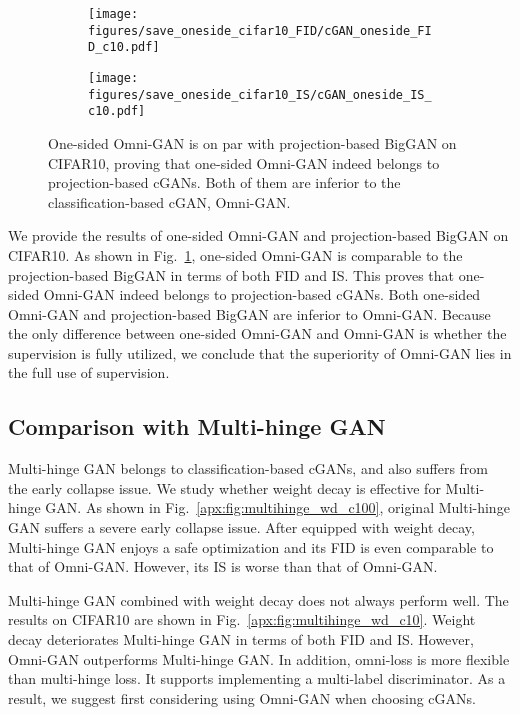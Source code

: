 \documentclass[paper_2425.tex]{subfiles}
\begin{document}
\begin{figure}[!t]
  \begin{subfigure}{0.49\linewidth}
    \centering
\texttt{[image: figures/save\_oneside\_cifar10\_FID/cGAN\_oneside\_FID\_c10.pdf]}
\caption{}
\end{subfigure}
  \begin{subfigure}{0.49\linewidth}
    \centering
\texttt{[image: figures/save\_oneside\_cifar10\_IS/cGAN\_oneside\_IS\_c10.pdf]}
\caption{}
\end{subfigure}
  \caption{One-sided Omni-GAN is on par with projection-based BigGAN on CIFAR10, proving that one-sided Omni-GAN indeed belongs to projection-based cGANs. Both of them are inferior to the classification-based cGAN, Omni-GAN.}
  \label{apx:fig:oneside_c10}
\end{figure}

We provide the results of one-sided Omni-GAN and projection-based BigGAN on CIFAR10. As shown in Fig.~\ref{apx:fig:oneside_c10}, one-sided Omni-GAN is comparable to the projection-based BigGAN in terms of both FID and IS. This proves that one-sided Omni-GAN indeed belongs to projection-based cGANs. Both one-sided Omni-GAN and projection-based BigGAN are inferior to Omni-GAN. Because the only difference between one-sided Omni-GAN and Omni-GAN is whether the supervision is fully utilized, we conclude that the superiority of Omni-GAN lies in the full use of supervision.


\subsection{Comparison with Multi-hinge GAN}
\label{sec:comparison_multihinge}

Multi-hinge GAN belongs to classification-based cGANs, and also suffers from the early collapse issue. We study whether weight decay is effective for Multi-hinge GAN. As shown in Fig.~\ref{apx:fig:multihinge_wd_c100}, original Multi-hinge GAN suffers a severe early collapse issue. After equipped with weight decay, Multi-hinge GAN enjoys a safe optimization and its FID is even comparable to that of Omni-GAN. However, its IS is worse than that of Omni-GAN.

Multi-hinge GAN combined with weight decay does not always perform well. The results on CIFAR10 are shown in Fig.~\ref{apx:fig:multihinge_wd_c10}. Weight decay deteriorates Multi-hinge GAN in terms of both FID and IS. However, Omni-GAN outperforms Multi-hinge GAN. In addition, omni-loss is more flexible than multi-hinge loss. It supports implementing a multi-label discriminator. As a result, we suggest first considering using Omni-GAN when choosing cGANs.
\end{document}
